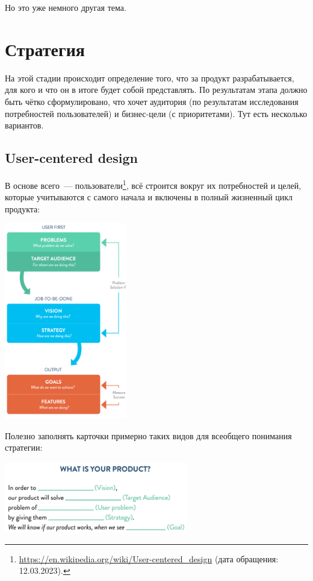 \documentclass{../../text-style}
\begin{document}
Но это уже немного другая тема.

\section{Стратегия}

На этой стадии происходит определение того, что за продукт разрабатывается, для кого и что он в итоге будет собой представлять. По результатам этапа должно быть чётко сформулировано, что хочет аудитория (по результатам исследования потребностей пользователей) и бизнес-цели (с приоритетами).
Тут есть несколько вариантов.

\subsection{User-centered design}

В основе всего~--- пользователи\footnote{\url{https://en.wikipedia.org/wiki/User-centered_design} (дата обращения: 12.03.2023).}, всё строится вокруг их потребностей и целей, которые учитываются с самого начала и включены в полный жизненный цикл продукта:

\begin{center}
    \includegraphics[width=0.4\textwidth]{userCenteredDesignProcess.png}
\end{center}

Полезно заполнять карточки примерно таких видов для всеобщего понимания стратегии:

\begin{center}
    \includegraphics[width=0.6\textwidth]{productCard.png}
\end{center}
\end{document}
